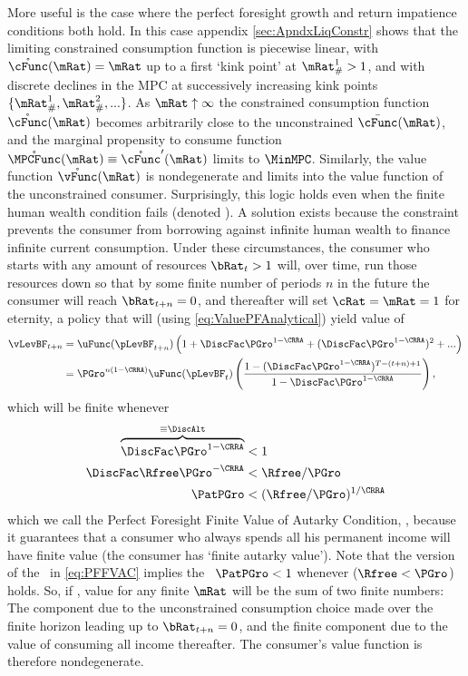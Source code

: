 \documentclass[BufferStockTheory]{subfiles}
\begin{document}
More useful is the case where the perfect foresight growth and return impatience conditions both hold.  In this case appendix \ref{sec:ApndxLiqConstr} shows that the limiting constrained consumption function is piecewise linear, with $\mathring{\cFunc}(\mRat)=\mRat$ up to a first `kink point' at $\mRat_{\#}^{1}>1$, and with discrete declines in the MPC at successively increasing kink points $\{\mRat_{\#}^{1},\mRat_{\#}^{2},...\}$.  As $\mRat \uparrow \infty$ the constrained consumption function $\mathring{\cFunc}(\mRat)$ becomes arbitrarily close to the unconstrained $\bar{\cFunc}(\mRat)$, and the marginal propensity to consume function $\mathring{\MPCFunc}(\mRat) \equiv \mathring{\cFunc}^{\prime}(\mRat)$ limits to $\MinMPC$.  Similarly, the value function $\mathring{\vFunc}(\mRat)$ is nondegenerate and limits into the value function of the unconstrained consumer.  Surprisingly, this logic holds even when the finite human wealth condition fails (denoted \cncl{\FHWC}).  A solution exists because the constraint prevents the consumer from borrowing against infinite human wealth to finance infinite current consumption.  Under these circumstances, the consumer who starts with any amount of resources $\bRat_{t} > 1$ will, over time, run those resources down so that by some finite number of periods $n$ in the future the consumer will reach $\bRat_{t+n} = 0$, and thereafter will set $\cRat = \mRat = 1$ for eternity, a policy that will (using \eqref{eq:ValuePFAnalytical}) yield value of \hypertarget{PFFVAC}{}
\begin{align}
  \vLevBF_{t+n}  & = \uFunc(\pLevBF_{t+n})\left(1+\DiscFac
                   \PGro^{1-\CRRA}+(\DiscFac \PGro^{1-\CRRA})^{2}+...\right) \notag
  \\  & = \PGro^{n(1-\CRRA)} \uFunc(\pLevBF_{t})\left(\frac{1-(\DiscFac
        \PGro^{1-\CRRA})^{T-(t+n)+1}}{1-\DiscFac \PGro^{1-\CRRA}}\right),
        \notag
\end{align}
which will be finite whenever 
\begin{align}
  \overbrace{\DiscFac \PGro^{1-\CRRA} }^{\equiv \DiscAlt}  & < 1 \label{eq:PFFVAC}
  \\ \DiscFac \Rfree \PGro^{-\CRRA}  & < \Rfree/\PGro \nonumber
  \\ \PatPGro  & < (\Rfree/\PGro)^{1/\CRRA} \nonumber
\end{align}
which we call the Perfect Foresight Finite Value of Autarky Condition, \PFFVAC, because it guarantees that a consumer who always spends all his permanent income will have finite value (the consumer has `finite autarky value').  Note that the version of the \PFFVAC~in \eqref{eq:PFFVAC} implies the \PFGIC~$\PatPGro < 1$ whenever \cncl{\FHWC} ($\Rfree < \PGro$) holds.  So, if \cncl{\FHWC}, value for any finite $\mRat$ will be the sum of two finite numbers: The component due to the unconstrained consumption choice made over the finite horizon leading up to $\bRat_{t+n} = 0$, and the finite component due to the value of consuming all income thereafter.  The consumer's value function is therefore nondegenerate.
\end{document}

